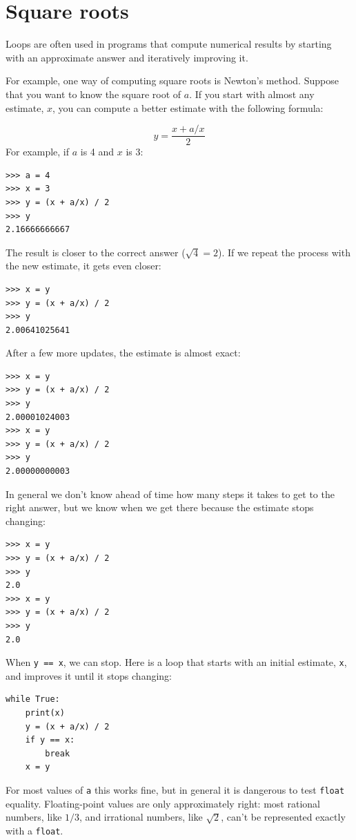 \documentclass[10pt]{book}
\begin{document}
\section{Square roots}
\label{squareroot}

Loops are often used in programs that compute
numerical results by starting with an approximate answer and
iteratively improving it.

For example, one way of computing square roots is Newton's method.
Suppose that you want to know the square root of $a$.  If you start
with almost any estimate, $x$, you can compute a better
estimate with the following formula:

\[ y = \frac{x + a/x}{2} \]
%
For example, if $a$ is 4 and $x$ is 3:

\begin{verbatim}
>>> a = 4
>>> x = 3
>>> y = (x + a/x) / 2
>>> y
2.16666666667
\end{verbatim}
%
The result is closer to the correct answer ($\sqrt{4} = 2$).  If we
repeat the process with the new estimate, it gets even closer:

\begin{verbatim}
>>> x = y
>>> y = (x + a/x) / 2
>>> y
2.00641025641
\end{verbatim}
%
After a few more updates, the estimate is almost exact:

\begin{verbatim}
>>> x = y
>>> y = (x + a/x) / 2
>>> y
2.00001024003
>>> x = y
>>> y = (x + a/x) / 2
>>> y
2.00000000003
\end{verbatim}
%
In general we don't know ahead of time how many steps it takes
to get to the right answer, but we know when we get there
because the estimate
stops changing:

\begin{verbatim}
>>> x = y
>>> y = (x + a/x) / 2
>>> y
2.0
>>> x = y
>>> y = (x + a/x) / 2
>>> y
2.0
\end{verbatim}
%
When {\tt y == x}, we can stop.  Here is a loop that starts
with an initial estimate, {\tt x}, and improves it until it
stops changing:

\begin{verbatim}
while True:
    print(x)
    y = (x + a/x) / 2
    if y == x:
        break
    x = y
\end{verbatim}
%
For most values of {\tt a} this works fine, but in general it is
dangerous to test {\tt float} equality.
Floating-point values are only approximately right:
most rational numbers, like $1/3$, and irrational numbers, like
$\sqrt{2}$, can't be represented exactly with a {\tt float}.
\end{document}
